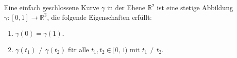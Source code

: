 \begin{definition}
%
%
    Eine einfach geschlossene Kurve $\gamma$ in der Ebene $\mathbb{R}^2$ ist eine stetige Abbildung $\gamma: [0,1] \to \mathbb{R}^2$, die folgende Eigenschaften erfüllt:
    \begin{enumerate}
        \item $\gamma(0) = \gamma(1)$.
        \item $\gamma(t_1) \neq \gamma(t_2)$ für alle $t_1, t_2 \in [0,1)$ mit $t_1 \neq t_2$.
    \end{enumerate}
\end{definition}
